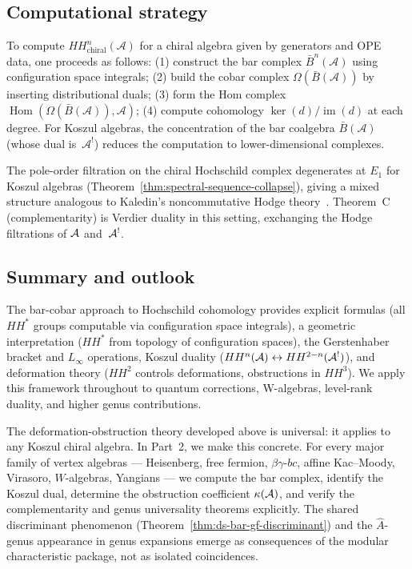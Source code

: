 \subsection{Computational strategy}

\begin{remark}\label{rem:compute-HH}
To compute $HH^n_{\mathrm{chiral}}(\mathcal{A})$ for a chiral algebra given by generators and OPE data, one proceeds as follows: (1) construct the bar complex $\bar{B}^n(\mathcal{A})$ using configuration space integrals; (2) build the cobar complex $\Omega(\bar{B}(\mathcal{A}))$ by inserting distributional duals; (3) form the Hom complex $\operatorname{Hom}(\Omega(\bar{B}(\mathcal{A})), \mathcal{A})$; (4) compute cohomology $\ker(d)/\operatorname{im}(d)$ at each degree. For Koszul algebras, the concentration of the bar coalgebra $\bar{B}(\mathcal{A})$ (whose dual is~$\mathcal{A}^!$) reduces the computation to lower-dimensional complexes.
\end{remark}

\begin{remark}\label{rem:nc-hodge-degeneration}
The pole-order filtration on the chiral Hochschild complex degenerates
at $E_1$ for Koszul algebras
(Theorem~\ref{thm:spectral-sequence-collapse}), giving a mixed
structure analogous to Kaledin's noncommutative Hodge
theory~\cite{Kal08}.  Theorem~C (complementarity) is Verdier duality in
this setting, exchanging the Hodge filtrations of $\mathcal{A}$ and~$\mathcal{A}^!$.
\end{remark}

\subsection{Summary and outlook}

The bar-cobar approach to Hochschild cohomology provides explicit formulas
(all $HH^*$ groups computable via configuration space integrals), a geometric
interpretation ($HH^*$ from topology of configuration spaces), the Gerstenhaber
bracket and $L_\infty$ operations, Koszul duality
($HH^n(\mathcal{A}) \leftrightarrow HH^{2-n}(\mathcal{A}^!)$), and deformation theory
($HH^2$ controls deformations, obstructions in $HH^3$).
We apply this framework throughout to quantum corrections, W-algebras,
level-rank duality, and higher genus contributions.

\medskip

The deformation-obstruction theory developed above is universal: it applies
to any Koszul chiral algebra.  In Part~2, we make this concrete.  For every
major family of vertex algebras --- Heisenberg, free fermion, $\beta\gamma$-$bc$,
affine Kac--Moody, Virasoro, $W$-algebras, Yangians --- we compute the bar
complex, identify the Koszul dual, determine the obstruction coefficient
$\kappa(\mathcal{A})$, and verify the complementarity and genus universality theorems
explicitly.  The shared discriminant phenomenon
(Theorem~\ref{thm:ds-bar-gf-discriminant}) and the $\hat{A}$-genus appearance
in genus expansions emerge as consequences of the modular characteristic
package, not as isolated coincidences.
